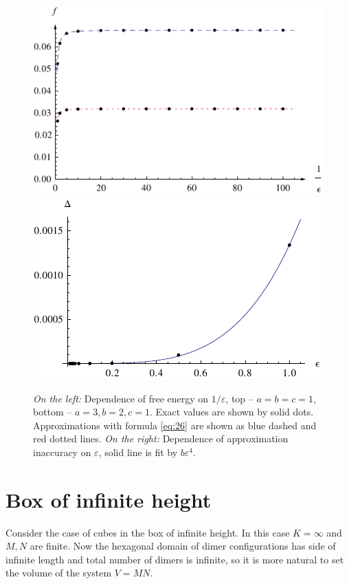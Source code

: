 \documentclass{article}
\begin{document}
\begin{figure}[htbp]
  \includegraphics[scale=0.9]{exact-vs-approximation}
  \includegraphics{error-1}
  \caption{\label{fig:approx-acc} {\it On the left:} Dependence of free energy on $1/\varepsilon$,
    top -- $a=b=c=1$, bottom -- $a=3, b=2, c=1$. Exact values are shown by solid dots.
    Approximations with formula \eqref{eq:26} are shown as blue dashed and red dotted lines. {\it On
      the right:} Dependence of approximation inaccuracy on $\varepsilon$, solid line is fit by $b\varepsilon^{4}$.}
\end{figure}

\section{Box of infinite height}
\label{sec:gener-other-doma}

Consider the case of cubes in the box of infinite height. In this case $K=\infty$ and $M,N$ are
finite. Now the hexagonal domain of dimer configurations has side of infinite length and total
number of dimers is infinite, so it is more natural to set the volume of the system $V=MN$.  
\end{document}
